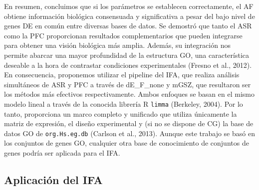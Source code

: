 \documentclass[12pt,twoside]{reedthesis}
\begin{document}
\par

En resumen, concluimos que si los parámetros se establecen correctamente, el AF obtiene información biológica consensuada y significativa a pesar del bajo nivel de genes DE en común entre diversas bases de datos. Se demostró que tanto el ASR como la PFC proporcionan resultados complementarios que pueden integrarse para obtener una visión biológica más amplia. Además, su integración nos permite abarcar una mayor profundidad de la estructura GO, una característica deseable a la hora de contrastar condiciones experimentales (Fresno et al., 2012). En consecuencia, proponemos utilizar el pipeline del IFA, que realiza análisis simultáneos de ASR y PFC a través de dE\_F\_none y mGSZ, que resultaron ser los métodos más efectivos respectivamente. Ambos enfoques se basan en el mismo modelo lineal a través de la conocida librería R \texttt{limma} (Berkeley, 2004). Por lo tanto, proporciona un marco completo y unificado que utiliza únicamente la matriz de expresión, el diseño experimental y (si no se dispone de CG) la base de datos GO de \texttt{org.Hs.eg.db} (Carlson et al., 2013). Aunque este trabajo se basó en los conjuntos de genes GO, cualquier otra base de conocimiento de conjuntos de genes podría ser aplicada para el IFA.

\hypertarget{aplicacion-del-ifa}{%
\subsection{Aplicación del IFA}\label{aplicacion-del-ifa}}

\par
\end{document}
